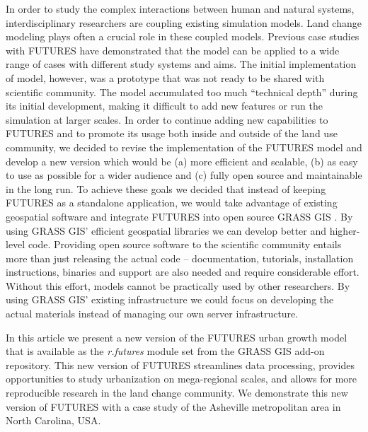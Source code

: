 \documentclass{isprs}
\begin{document}
In order to study the complex interactions between human and natural systems,
interdisciplinary researchers are coupling
existing simulation models.
Land change modeling plays often a crucial role in these coupled models.
Previous case studies with FUTURES have demonstrated 
that the model can be applied to a wide range of cases with different study systems and aims.
%
The initial implementation of model, however, was a prototype that was not ready
to be shared
with scientific community. 
%
The model accumulated too much ``technical depth'' \cite{easterbrook2014open} during its initial development, 
making it difficult to add new features or run the simulation at larger scales.
%
In order to continue adding new capabilities to FUTURES and to promote
its usage 
both inside and outside of 
the land use community,
we decided to revise the implementation of the FUTURES model 
and develop a new version which would be (a) more efficient and scalable, 
(b) as easy to use as possible for a wider audience and (c)
fully open source and maintainable in the long run.
To achieve these goals we 
decided that instead of keeping FUTURES as a standalone application,
we would take advantage of existing geospatial software and integrate FUTURES
into open source GRASS GIS \cite{Neteler08}.
By using GRASS GIS' efficient geospatial libraries
we can develop better and higher-level code.
%
Providing open source software to the scientific community entails more than just releasing the actual code -- 
documentation, tutorials, installation
instructions, binaries and support are also needed 
and require considerable effort. %
Without this effort, models cannot be practically used by other researchers.
%
By using GRASS GIS' existing infrastructure we could focus on developing the actual materials
instead of managing our own server infrastructure.

In this article we present a new version of the FUTURES urban growth model that is 
available as the \emph{r.futures} module set from the GRASS GIS add-on repository.
This new version of FUTURES
streamlines data processing, provides opportunities to study urbanization on mega-regional scales, 
and allows for more reproducible research in the land change community. 
We demonstrate this new version of FUTURES with a case study of the Asheville metropolitan area in North Carolina, USA.


\end{document}

